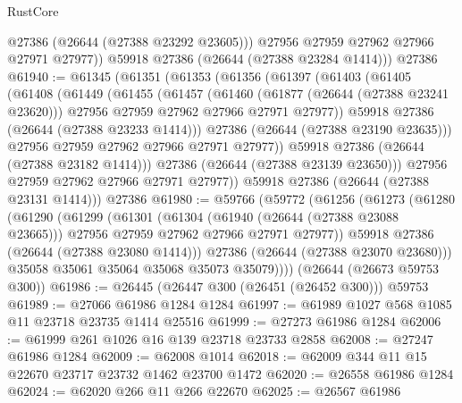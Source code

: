 \begin{lexlean}{RustCore}
\begin{coremodule}
            @27386
            (@26644 (@27388 @23292 @23605)))
          @27956
          @27959
          @27962
          @27966
          @27971
          @27977))
      @59918
      @27386
      (@26644 (@27388 @23284 @1414)))
    @27386
@61940 := @61345
    (@61351
      (@61353
        (@61356
          (@61397
            (@61403
              (@61405
                (@61408
                  (@61449
                    (@61455
                      (@61457
                        (@61460
                          (@61877 (@26644 (@27388 @23241 @23620)))
                          @27956
                          @27959
                          @27962
                          @27966
                          @27971
                          @27977))
                      @59918
                      @27386
                      (@26644 (@27388 @23233 @1414)))
                    @27386
                    (@26644 (@27388 @23190 @23635)))
                  @27956
                  @27959
                  @27962
                  @27966
                  @27971
                  @27977))
              @59918
              @27386
              (@26644 (@27388 @23182 @1414)))
            @27386
            (@26644 (@27388 @23139 @23650)))
          @27956
          @27959
          @27962
          @27966
          @27971
          @27977))
      @59918
      @27386
      (@26644 (@27388 @23131 @1414)))
    @27386
@61980 := @59766
    (@59772
      (@61256
        (@61273
          (@61280
            (@61290
              (@61299
                (@61301
                  (@61304
                    (@61940 (@26644 (@27388 @23088 @23665)))
                    @27956
                    @27959
                    @27962
                    @27966
                    @27971
                    @27977))
                @59918
                @27386
                (@26644 (@27388 @23080 @1414)))
              @27386
              (@26644 (@27388 @23070 @23680)))
            @35058
            @35061
            @35064
            @35068
            @35073
            @35079))))
    (@26644 (@26673 @59753 @300))
@61986 := @26445 (@26447 @300 (@26451 (@26452 @300))) @59753
@61989 := @27066 @61986 @1284 @1284
@61997 := @61989 @1027 @568 @1085 @11 @23718 @23735 @1414 @25516
@61999 := @27273 @61986 @1284
@62006 := @61999 @261 @1026 @16 @139 @23718 @23733 @2858
@62008 := @27247 @61986 @1284
@62009 := @62008 @1014
@62018 := @62009 @344 @11 @15 @22670 @23717 @23732 @1462 @23700 @1472
@62020 := @26558 @61986 @1284
@62024 := @62020 @266 @11 @266 @22670
@62025 := @26567 @61986

\end{coremodule}
\end{lexlean}
